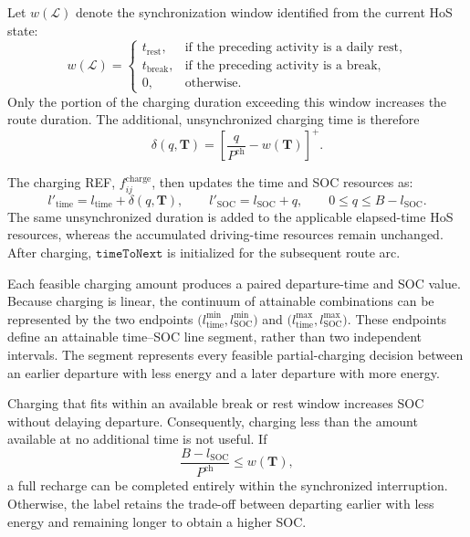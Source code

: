 \documentclass[3p,11pt,authoryear]{elsarticle}  %
\begin{document}
Let \(w(\mathcal{L})\) denote the synchronization window identified from
the current HoS state:
\[
w(\mathcal{L})=
\begin{cases}
t_{\mathrm{rest}},
    & \text{if the preceding activity is a daily rest},\\[2pt]
t_{\mathrm{break}},
    & \text{if the preceding activity is a break},\\[2pt]
0,
    & \text{otherwise}.
\end{cases}
\]
Only the portion of the charging duration exceeding this window
increases the route duration. The additional, unsynchronized charging
time is therefore
\[
\delta(q,\mathbf{T})
=
\left[
\frac{q}{P^{\mathrm{ch}}}-w(\mathbf{T})
\right]^+.
\]

The charging REF, $f^{\mathrm{charge}}_{ij}$, then updates the time and SOC resources as:
\[
l'_{\mathrm{time}}
=
l_{\mathrm{time}}+\delta(q,\mathbf{T}),
\qquad
l'_{\mathrm{SOC}}
=
l_{\mathrm{SOC}}+q,
\qquad
0\leq q\leq B-l_{\mathrm{SOC}}.
\]
The same unsynchronized duration is added to the applicable
elapsed-time HoS resources, whereas the accumulated driving-time
resources remain unchanged. %
After charging, \(\texttt{timeToNext}\) is initialized for the subsequent route arc.

Each feasible charging amount produces a paired departure-time and SOC value. Because charging is linear, the continuum of attainable combinations can be represented by the two endpoints
$
\bigl(l_{\mathrm{time}}^{\min},l_{\mathrm{SOC}}^{\min}\bigr)
$ and $
\bigl(l_{\mathrm{time}}^{\max},l_{\mathrm{SOC}}^{\max}\bigr).
$
These endpoints define an attainable time--SOC line segment, rather than two independent intervals. The segment represents every feasible partial-charging decision between an earlier departure with less energy and a later departure with more energy.


Charging that fits within an available break or rest window increases
SOC without delaying departure. Consequently, charging less than the
amount available at no additional time is not useful. If
\[
\frac{B-l_{\mathrm{SOC}}}{P^{\mathrm{ch}}}\leq w(\mathbf{T}),
\]
a full recharge can be completed entirely within the synchronized
interruption. Otherwise, the label retains the trade-off between
departing earlier with less energy and remaining longer to obtain a
higher SOC.
\end{document}
